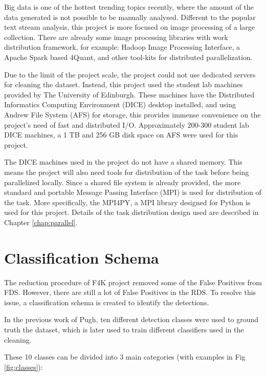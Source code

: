 \documentclass[bsc,logo,twoside,fullspacing,parskip]{infthesis}
\begin{document}
Big data is one of the hottest trending topics recently, where the amount of the data generated is not possible to be manually analysed. 
Different to the popular text stream analysis, this project is more focused on image processing of a large collection. 
There are already some image processing libraries with work distribution framework, for example: Hadoop Image Processing Interface\cite{L3}, a Apache Spark based 4Quant\cite{L4}, and other tool-kits for distributed parallelization.

Due to the limit of the project scale, the project could not use dedicated servers for cleaning the dataset.
Instead, this project used the student lab machines provided by The University of Edinburgh.
These machines have the Distributed Informatics Computing Environment (DICE) desktop installed, and using Andrew File System (AFS) for storage, this provides immense convenience on the project's need of fast and distributed I/O.
Approximately 200-300 student lab DICE machines, a 1 TB and 256 GB disk space on AFS were used for this project.

The DICE machines used in the project do not have a shared memory. 
This means the project will also need tools for distribution of the task before being parallelized locally.
Since a shared file system is already provided, the more standard and portable Message Passing Interface (MPI) is used for distribution of the task. 
More specifically, the MPI4PY\cite{MPI4PY}, a MPI library designed for Python is used for this project. Details of the task distribution design used are described in Chapter \ref{chap:parallel}.

\section{Classification Schema}
\label{sec:schema}

The reduction procedure of F4K project removed some of the False Positives from FDS. 
However, there are still a lot of False Positives in the RDS. 
To resolve this issue, a classification schema is created to identify the detections.

In the previous work of Pugh\cite{Pugh}, ten different detection classes were used to ground truth the dataset, which is later used to train different classifiers used in the cleaning. 

These 10 classes can be divided into 3 main categories (with examples in Fig \ref{fig:classes}):

\renewcommand{\labelenumi}{\bfseries\Roman{enumi}}
\renewcommand{\labelenumii}{\bfseries\arabic{enumii}}
\renewcommand{\labelenumiii}{\bfseries\roman{enumiii}}
\end{document}
